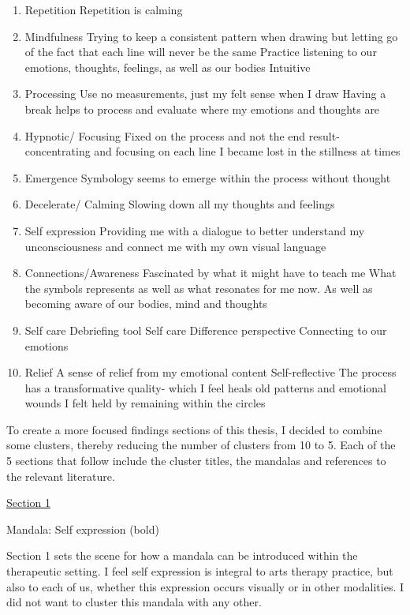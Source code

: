 \begin{enumerate}
\item Repetition
Repetition is calming
\item Mindfulness
Trying to keep a consistent pattern when drawing but letting go of the fact that each line will never be the same
Practice listening to our emotions, thoughts, feelings, as well as our bodies
Intuitive
\item Processing
Use no measurements, just my felt sense when I draw
Having a break helps to process and evaluate where my emotions and thoughts are
\item Hypnotic/ Focusing
Fixed on the process and not the end result- concentrating and focusing on each line
I became lost in the stillness at times
\item Emergence
Symbology seems to emerge within the process without thought
\item Decelerate/ Calming
Slowing down all my thoughts and feelings
\item Self expression
Providing me with a dialogue to better understand my unconsciousness and connect me with my own visual language
\item Connections/Awareness
Fascinated by what it might have to teach me
What the symbols represents as well as what resonates for me now. As well as becoming aware of our bodies, mind and thoughts
\item Self care
Debriefing tool
Self care
Difference perspective
Connecting to our emotions
\item Relief
A sense of relief from my emotional content
Self-reflective
The process has a transformative quality- which I feel heals old patterns and emotional wounds
I felt held by remaining within the circles
\end{enumerate}

To create a more focused findings sections of this thesis, I decided to combine some clusters, thereby reducing the number of clusters from 10 to 5. Each of the 5 sections that follow include the cluster titles, the mandalas and references to the relevant literature.  

\underline{Section 1}

Mandala: 
Self expression (bold) 

Section 1 sets the scene for how a mandala can be introduced within the therapeutic setting. I feel self expression is integral to arts therapy practice, but also to each of us, whether this expression occurs visually or in other modalities. I did not want to cluster this mandala with any other. 


